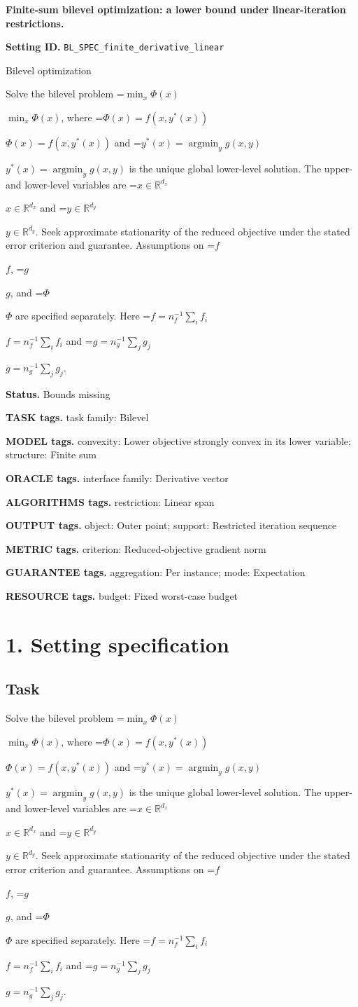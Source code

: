 \documentclass[10pt,a4paper]{article}
\newcommand{\AtlasMath}[1]{\par\begingroup\centering\setbox0=\hbox{$\displaystyle #1$}\ifdim\wd0>1.4\linewidth\typeout{ATLAS WIDE FORMULA: \the\wd0}\fi\ifdim\wd0>\linewidth\resizebox{\linewidth}{!}{\box0}\else\box0\fi\par\endgroup}
\newcommand{\AtlasInlineMath}[1]{\begingroup\setbox0=\hbox{$#1$}\ifdim\wd0>.4\linewidth\endgroup\AtlasMath{#1}\else\endgroup$#1$\fi}
\begin{document}
\raggedright

{\LARGE\bfseries\sffamily\color{AtlasNavy} Finite-sum bilevel optimization: a lower bound under linear-iteration restrictions.\par}\vspace{5pt}
\textbf{Setting ID.} \texttt{BL\_\allowbreak{}SPEC\_\allowbreak{}finite\_\allowbreak{}derivative\_\allowbreak{}linear}

Bilevel optimization

Solve the bilevel problem \AtlasInlineMath{\min_x\Phi(x)}, where \AtlasInlineMath{\Phi(x)=f(x,y^*(x))} and \AtlasInlineMath{y^*(x)=\operatorname*{argmin}_y g(x,y)} is the unique global lower-level solution. The upper- and lower-level variables are \AtlasInlineMath{x\in\mathbb{R}^{d_x}} and \AtlasInlineMath{y\in\mathbb{R}^{d_y}}. Seek approximate stationarity of the reduced objective under the stated error criterion and guarantee. Assumptions on \AtlasInlineMath{f}, \AtlasInlineMath{g}, and \AtlasInlineMath{\Phi} are specified separately. Here \AtlasInlineMath{f=n_f^{-1}\sum_if_i} and \AtlasInlineMath{g=n_g^{-1}\sum_jg_j}.

\textbf{Status.} Bounds missing

\textbf{TASK tags.} task family: Bilevel

\textbf{MODEL tags.} convexity: Lower objective strongly convex in its lower variable; structure: Finite sum

\textbf{ORACLE tags.} interface family: Derivative vector

\textbf{ALGORITHMS tags.} restriction: Linear span

\textbf{OUTPUT tags.} object: Outer point; support: Restricted iteration sequence

\textbf{METRIC tags.} criterion: Reduced-objective gradient norm

\textbf{GUARANTEE tags.} aggregation: Per instance; mode: Expectation

\textbf{RESOURCE tags.} budget: Fixed worst-case budget

\section{1. Setting specification}
\subsection{Task}
Solve the bilevel problem \AtlasInlineMath{\min_x\Phi(x)}, where \AtlasInlineMath{\Phi(x)=f(x,y^*(x))} and \AtlasInlineMath{y^*(x)=\operatorname*{argmin}_y g(x,y)} is the unique global lower-level solution. The upper- and lower-level variables are \AtlasInlineMath{x\in\mathbb{R}^{d_x}} and \AtlasInlineMath{y\in\mathbb{R}^{d_y}}. Seek approximate stationarity of the reduced objective under the stated error criterion and guarantee. Assumptions on \AtlasInlineMath{f}, \AtlasInlineMath{g}, and \AtlasInlineMath{\Phi} are specified separately. Here \AtlasInlineMath{f=n_f^{-1}\sum_if_i} and \AtlasInlineMath{g=n_g^{-1}\sum_jg_j}.
\end{document}
